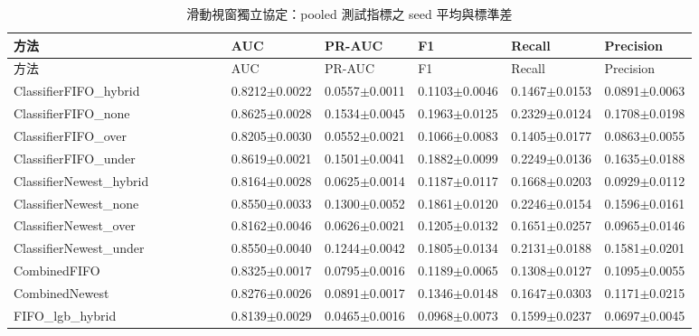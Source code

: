 \begingroup
\scriptsize
\setlength{\tabcolsep}{3pt}
\setlength{\LTleft}{0pt}
\setlength{\LTright}{0pt}
\begin{longtable}{p{0.28\linewidth}p{0.12\linewidth}p{0.12\linewidth}p{0.12\linewidth}p{0.12\linewidth}p{0.12\linewidth}}
\caption{滑動視窗獨立協定：pooled 測試指標之 seed 平均與標準差}\label{tab:study3b_pooled}\\
\toprule
方法 & AUC & PR-AUC & F1 & Recall & Precision \\
\midrule
\endfirsthead
\toprule
方法 & AUC & PR-AUC & F1 & Recall & Precision \\
\midrule
\endhead
\bottomrule
\endfoot
ClassifierFIFO\_\allowbreak{}hybrid & 0.8212\(\pm\)0.0022 & 0.0557\(\pm\)0.0011 & 0.1103\(\pm\)0.0046 & 0.1467\(\pm\)0.0153 & 0.0891\(\pm\)0.0063 \\
ClassifierFIFO\_\allowbreak{}none & 0.8625\(\pm\)0.0028 & 0.1534\(\pm\)0.0045 & 0.1963\(\pm\)0.0125 & 0.2329\(\pm\)0.0124 & 0.1708\(\pm\)0.0198 \\
ClassifierFIFO\_\allowbreak{}over & 0.8205\(\pm\)0.0030 & 0.0552\(\pm\)0.0021 & 0.1066\(\pm\)0.0083 & 0.1405\(\pm\)0.0177 & 0.0863\(\pm\)0.0055 \\
ClassifierFIFO\_\allowbreak{}under & 0.8619\(\pm\)0.0021 & 0.1501\(\pm\)0.0041 & 0.1882\(\pm\)0.0099 & 0.2249\(\pm\)0.0136 & 0.1635\(\pm\)0.0188 \\
ClassifierNewest\_\allowbreak{}hybrid & 0.8164\(\pm\)0.0028 & 0.0625\(\pm\)0.0014 & 0.1187\(\pm\)0.0117 & 0.1668\(\pm\)0.0203 & 0.0929\(\pm\)0.0112 \\
ClassifierNewest\_\allowbreak{}none & 0.8550\(\pm\)0.0033 & 0.1300\(\pm\)0.0052 & 0.1861\(\pm\)0.0120 & 0.2246\(\pm\)0.0154 & 0.1596\(\pm\)0.0161 \\
ClassifierNewest\_\allowbreak{}over & 0.8162\(\pm\)0.0046 & 0.0626\(\pm\)0.0021 & 0.1205\(\pm\)0.0132 & 0.1651\(\pm\)0.0257 & 0.0965\(\pm\)0.0146 \\
ClassifierNewest\_\allowbreak{}under & 0.8550\(\pm\)0.0040 & 0.1244\(\pm\)0.0042 & 0.1805\(\pm\)0.0134 & 0.2131\(\pm\)0.0188 & 0.1581\(\pm\)0.0201 \\
CombinedFIFO & 0.8325\(\pm\)0.0017 & 0.0795\(\pm\)0.0016 & 0.1189\(\pm\)0.0065 & 0.1308\(\pm\)0.0127 & 0.1095\(\pm\)0.0055 \\
CombinedNewest & 0.8276\(\pm\)0.0026 & 0.0891\(\pm\)0.0017 & 0.1346\(\pm\)0.0148 & 0.1647\(\pm\)0.0303 & 0.1171\(\pm\)0.0215 \\
FIFO\_\allowbreak{}lgb\_\allowbreak{}hybrid & 0.8139\(\pm\)0.0029 & 0.0465\(\pm\)0.0016 & 0.0968\(\pm\)0.0073 & 0.1599\(\pm\)0.0237 & 0.0697\(\pm\)0.0045 \\

\end{longtable}

